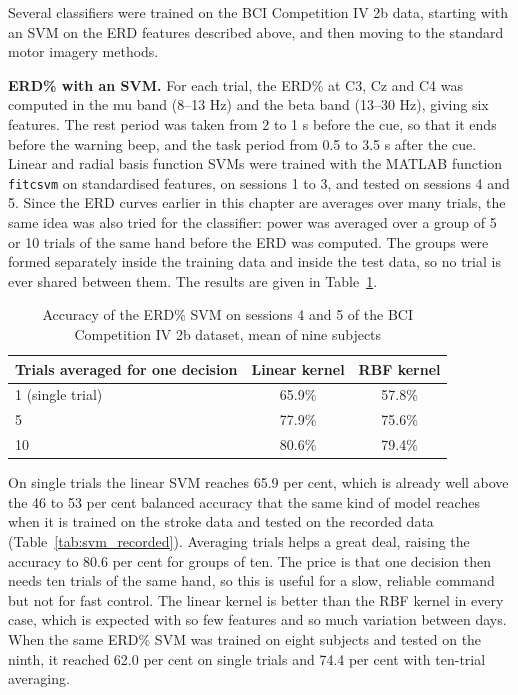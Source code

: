 Several classifiers were trained on the BCI Competition IV 2b data, starting with an SVM
on the ERD features described above, and then moving to the standard motor imagery
methods.

\textbf{ERD\% with an SVM.} For each trial, the ERD\% at C3, Cz and C4 was computed in the mu
band (8--13 Hz) and the beta band (13--30 Hz), giving six features. The rest period was
taken from 2 to 1 s before the cue, so that it ends before the warning beep, and the task
period from 0.5 to 3.5 s after the cue. Linear and radial basis function SVMs were trained
with the MATLAB function \texttt{fitcsvm} on standardised features, on sessions 1 to 3, and
tested on sessions 4 and 5. Since the ERD curves earlier in this chapter are averages over
many trials, the same idea was also tried for the classifier: power was averaged over a
group of 5 or 10 trials of the same hand before the ERD was computed. The groups were
formed separately inside the training data and inside the test data, so no trial is ever
shared between them. The results are given in Table~\ref{tab:bci2b_erdsvm}.

\begin{table}[!htbp]
\centering
\caption{Accuracy of the ERD\% SVM on sessions 4 and 5 of the BCI Competition IV 2b dataset, mean of nine subjects}
\label{tab:bci2b_erdsvm}
\begin{tabular}{|l|c|c|}
\hline
\textbf{Trials averaged for one decision} & \textbf{Linear kernel} & \textbf{RBF kernel} \\
\hline
1 (single trial) & 65.9\% & 57.8\% \\
\hline
5 & 77.9\% & 75.6\% \\
\hline
10 & 80.6\% & 79.4\% \\
\hline
\end{tabular}
\end{table}

On single trials the linear SVM reaches 65.9 per cent, which is already well above the
46 to 53 per cent balanced accuracy that the same kind of model reaches when it is trained
on the stroke data and tested on the recorded data (Table~\ref{tab:svm_recorded}). Averaging trials helps a great deal, raising
the accuracy to 80.6 per cent for groups of ten. The price is that one decision then needs
ten trials of the same hand, so this is useful for a slow, reliable command but not for
fast control. The linear kernel is better than the RBF kernel in every case, which is
expected with so few features and so much variation between days. When the same ERD\% SVM
was trained on eight subjects and tested on the ninth, it reached 62.0 per cent on single
trials and 74.4 per cent with ten-trial averaging.

